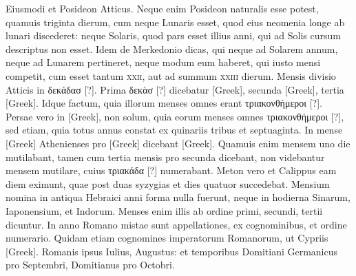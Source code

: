 Eiusmodi et Posideon Atticus.
Neque enim Posideon
naturalis esse potest, quamuis triginta dierum, cum neque Lunaris
esset, quod eius neomenia longe ab lunari discederet: neque Solaris,
quod pars esset illius anni, qui ad Solis cursum descriptus non esset.
Idem de Merkedonio dicas, qui neque ad Solarem annum, neque ad
Lunarem pertineret, neque modum eum haberet, qui iusto mensi
competit, cum esset tantum \textsc{xxii}, aut ad summum \textsc{xxiii} dierum.
Mensis divisio Atticis in \textgreek{δεκάδασ [?]}.
Prima \textgreek{δεκὰσ [?]} dicebatur \textgreek{[Greek]},
secunda \textgreek{[Greek]}, tertia \textgreek{[Greek]}.
Idque factum, quia
illorum menses omnes erant \textgreek{τριακονθήμεροι [?]}.
Persae vero in \textgreek{[Greek]},
non solum, quia eorum menses omnes \textgreek{τριακονθήμεροι [?]},
 sed etiam, quia
totus annus constat ex quinariis tribus et septuaginta.
In mense \textgreek{[Greek]}
Athenienses pro \textgreek{[Greek]} dicebant \textgreek{[Greek]}.
Quamuis
enim mensem uno die mutilabant, tamen cum tertia mensis
pro secunda dicebant, non videbantur mensem mutilare, cuius
\textgreek{τριακάδα [?]} numerabant.
Meton vero et Calippus eam diem eximunt,
quae post duas syzygias et dies quatuor succedebat.
Mensium nomina
in antiqua Hebraici anni forma nulla fuerunt, neque in hodierna
Sinarum, Iaponensium, et Indorum.
Menses enim illis ab ordine
primi, secundi, tertii dicuntur.
In anno Romano mistae sunt appellationes,
ex cognominibus, et ordine numerario.
Quidam etiam cognomines
imperatorum Romanorum, ut Cypriis \textgreek{[Greek]}.
Romanis ipsus Iulius, Augustus: et temporibus Domitiani
Germanicus pro Septembri, Domitianus pro Octobri.
